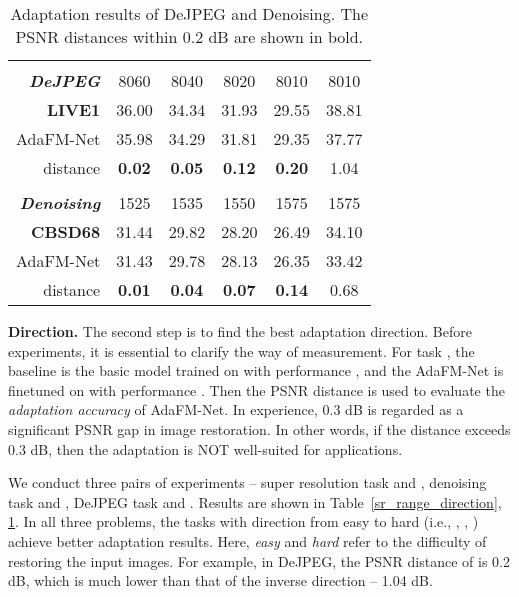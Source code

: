 \documentclass[10pt,twocolumn,letterpaper]{article}
\begin{document}
\begin{table}[]
	\small
	\setlength{\tabcolsep}{5pt}
	\renewcommand{\arraystretch}{0.9}
	\begin{tabular}{@{}rccccc@{}}
\toprule
		& \multicolumn{4}{c}{} 
		& \multicolumn{1}{c}{}\\
\cmidrule(r{4pt}){2-5}  \cmidrule(l{4pt}){6-6}
		\textbf{\textit{DeJPEG}}
		& 8060 & 8040 & 8020 & 8010 &8010 \\ \midrule
\textbf{LIVE1} & 36.00  &34.34 &31.93 &  29.55 &  38.81\\
AdaFM-Net & 35.98 & 34.29 &31.81 & 29.35 &37.77\\
		\cmidrule{2-6}
distance & \textbf{0.02} &\textbf{ 0.05} &\textbf{ 0.12} & \textbf{0.20} &1.04 \\
		\bottomrule
		\\
		\specialrule{0em}{0pt}{-0.5em}
		\textit{\textbf{Denoising}}
		& 1525 & 1535 & 1550 & 1575 & 1575 \\ \midrule
\textbf{CBSD68} & 31.44 & 29.82 & 28.20 & 26.49 & 34.10\\
AdaFM-Net & 31.43 & 29.78 & 28.13 & 26.35 & 33.42\\
		\cmidrule{2-6}
distance & \textbf{0.01} & \textbf{0.04} & \textbf{0.07} & \textbf{0.14} & 0.68 \\
		\bottomrule
	\end{tabular}
	\vspace{-1em}
	\caption{Adaptation results of DeJPEG and Denoising. The PSNR distances within 0.2 dB are shown in bold.}
	\vspace{-2em}
	\label{jpeg_range_direction}
\end{table}


\textbf{Direction.}
\label{sec:direction}
The second step is to find the best adaptation direction. Before experiments, it is essential to clarify the way of measurement. For task , the baseline is the basic model trained on  with performance , and the AdaFM-Net is finetuned on  with performance . Then the PSNR distance  is used to evaluate the \textit{adaptation accuracy} of AdaFM-Net. In experience, 0.3 dB is regarded as a significant PSNR gap in image restoration. In other words, if the distance  exceeds 0.3 dB, then the adaptation is NOT well-suited for applications. 

We conduct three pairs of experiments -- super resolution task  and , denoising task  and , DeJPEG task  and . Results are shown in Table~\ref{sr_range_direction}, \ref{jpeg_range_direction}. In all three problems, the tasks with direction from easy to hard (i.e., , , ) achieve better adaptation results. Here, \textit{easy} and \textit{hard} refer to the difficulty of restoring the input images. For example, in DeJPEG, the PSNR distance of  is 0.2 dB, which is much lower than that of the inverse direction  -- 1.04 dB.
\end{document}
